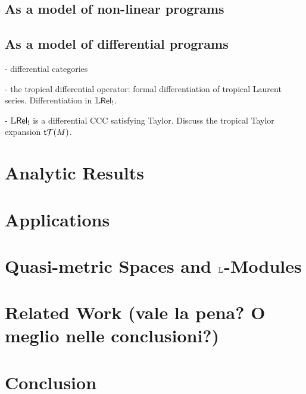 \documentclass[conference]{IEEEtran}
\begin{document}


\subsection{As a model of non-linear programs}




\subsection{As a model of differential programs}

- differential categories

- the tropical differential operator: formal differentiation of tropical Laurent series. Differentiation in $\mathbb{L}\mathsf{Rel}_{!}$.

- $\mathbb{L}\mathsf{Rel}_{!}$ is a differential CCC satisfying Taylor. 
Discuss the tropical Taylor expansion $\mathsf{t} \mathcal{T}(M)$. 



\section{Analytic Results}




\section{Applications}



\section{Quasi-metric Spaces and $\mathbb{L}$-Modules}


\section{Related Work (vale la pena? O meglio nelle conclusioni?)}


\section{Conclusion}


\end{document}

